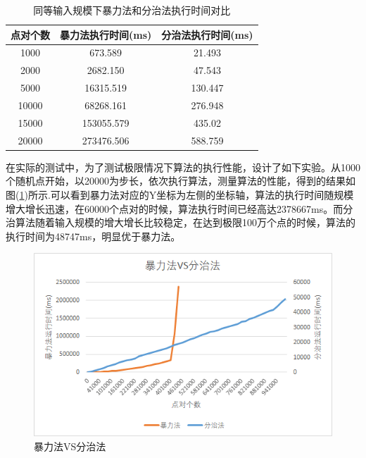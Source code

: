 \documentclass[UTF8]{ctexart}
\begin{document}
\begin{table}[H]
    \caption{同等输入规模下暴力法和分治法执行时间对比}
    \label{table-1}
    \begin{center}
        \begin{tabular}{ccc}
            \hline
            点对个数&   暴力法执行时间(ms)&     分治法执行时间(ms)\\
            \hline
            1000&       673.589&                21.493\\
            2000&       2682.150&               47.543\\
            5000&       16315.519&              130.447\\
            10000&      68268.161&              276.948\\
            15000&      153055.579&             435.02\\
            20000&      273476.506&             588.759\\
            \hline
        \end{tabular}  
    \end{center}
\end{table}

在实际的测试中，为了测试极限情况下算法的执行性能，设计了如下实验。从1000个随机点开始，以20000为步长，依次执行算法，测量算法的性能，得到的结果如图(\ref{img1-1})所示.可以看到暴力法对应的Y坐标为左侧的坐标轴，算法的执行时间随规模增大增长迅速，在60000个点对的时候，算法执行时间已经高达2378667ms。而分治算法随着输入规模的增大增长比较稳定，在达到极限100万个点的时候，算法的执行时间为48747ms，明显优于暴力法。

\begin{figure}[H]
    \centering
    \includegraphics[width=1\textwidth]{img/1-1.png}
    \caption{暴力法VS分治法}
    \label{img1-1}
\end{figure}
\end{document}
